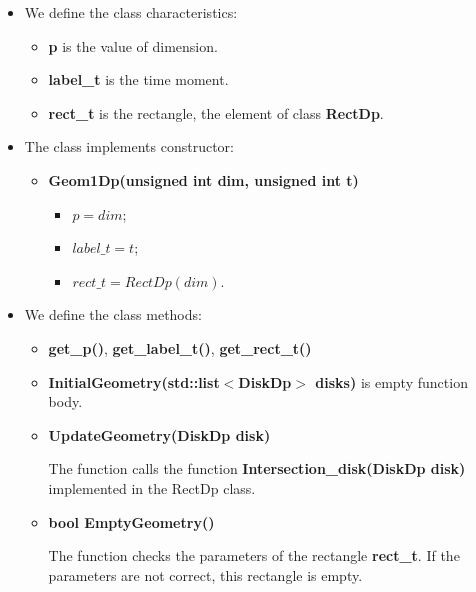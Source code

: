 \documentclass{report}
\begin{document}
	\begin{itemize}
		\item We define the class characteristics: 
		\begin{itemize}
			\item {\bfseries p} is the value of dimension.
			
			\item {\bfseries label\_t} is the time moment.
			
			\item {\bfseries rect\_t} is the rectangle, the element of class {\bfseries RectDp}.
			
		\end{itemize}
		
		\item The class implements constructor:
		\begin{itemize}
			\item {\bfseries Geom1Dp(unsigned  int dim, unsigned  int t)}
			\begin{itemize}
				\item $p = dim$;
				\item $label\_t = t$;
				\item $rect\_t = RectDp(dim)$.
			\end{itemize}	
		\end{itemize}
		
		\item We define the class methods:
		
		\begin{itemize}
			\item  {\bfseries get\_p()}, {\bfseries get\_label\_t()}, {\bfseries get\_rect\_t()}
			
			\item {\bfseries InitialGeometry(std::list$<$DiskDp$>$ disks)}  is empty function body.	
			
			\item {\bfseries UpdateGeometry(DiskDp disk)} 
			
			The function calls the function {\bfseries Intersection\_disk(DiskDp disk)}  implemented in the RectDp class.
			
			\item {\bfseries bool EmptyGeometry()}
			
			The function checks the parameters of the rectangle {\bfseries rect\_t}. If the parameters are not correct, this rectangle is empty. 
		\end{itemize}
	\end{itemize}
\end{document}
